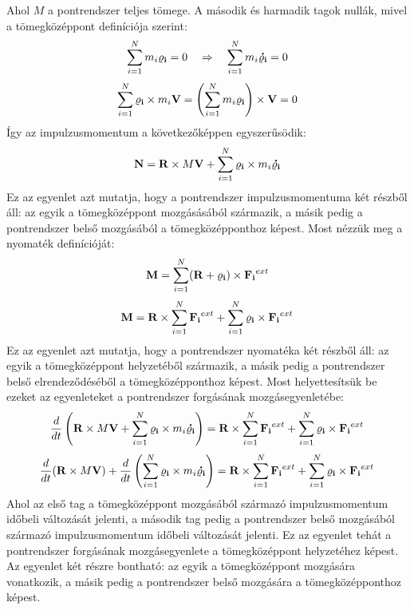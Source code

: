 \documentclass[a4paper,12pt]{article}
\begin{document}
Ahol $M$ a pontrendszer teljes tömege. A második és harmadik tagok nullák, mivel a tömegközéppont definíciója szerint:
\begin{equation}
    \sum_{i=1}^{N} m_i \bold{\varrho_i} = 0 \quad \Rightarrow \quad \sum_{i=1}^{N} m_i \bold{\dot{\varrho_i}} = 0
\end{equation}
\begin{equation}
    \sum_{i=1}^{N} \bold{\varrho_i} \times m_i \bold{V} = \left(\sum_{i=1}^{N} m_i \bold{\varrho_i}\right) \times \bold{V} = 0
\end{equation}
Így az impulzusmomentum a következőképpen egyszerűsödik:
\begin{equation}
    \bold{N} = \bold{R} \times M \bold{V} + \sum_{i=1}^{N} \bold{\varrho_i} \times m_i \bold{\dot{\varrho_i}}
\end{equation}
Ez az egyenlet azt mutatja, hogy a pontrendszer impulzusmomentuma két részből áll: az egyik a tömegközéppont mozgásásából származik, a másik pedig a pontrendszer belső mozgásából a tömegközépponthoz képest.
Most nézzük meg a nyomaték definícióját:
\begin{equation}
    \bold{M} = \sum_{i=1}^{N} (\bold{R} + \bold{\varrho_i}) \times \bold{F_i}^{ext}
\end{equation}
\begin{equation}
    \bold{M} = \bold{R} \times \sum_{i=1}^{N} \bold{F_i}^{ext} + \sum_{i=1}^{N} \bold{\varrho_i} \times \bold{F_i}^{ext}
\end{equation}
Ez az egyenlet azt mutatja, hogy a pontrendszer nyomatéka két részből áll: az egyik a tömegközéppont helyzetéből származik, a másik pedig a pontrendszer belső elrendeződéséből a tömegközépponthoz képest.
Most helyettesítsük be ezeket az egyenleteket a pontrendszer forgásának mozgásegyenletébe:
\begin{equation}
    \frac{d}{dt} \left(\bold{R} \times M \bold{V} + \sum_{i=1}^{N} \bold{\varrho_i} \times m_i \bold{\dot{\varrho_i}}\right) = \bold{R} \times \sum_{i=1}^{N} \bold{F_i}^{ext} + \sum_{i=1}^{N} \bold{\varrho_i} \times \bold{F_i}^{ext}
\end{equation}
\begin{equation}
    \frac{d}{dt} (\bold{R} \times M \bold{V}) + \frac{d}{dt} \left(\sum_{i=1}^{N} \bold{\varrho_i} \times m_i \bold{\dot{\varrho_i}}\right) = \bold{R} \times \sum_{i=1}^{N} \bold{F_i}^{ext} + \sum_{i=1}^{N} \bold{\varrho_i} \times \bold{F_i}^{ext}
\end{equation}
Ahol az első tag a tömegközéppont mozgásából származó impulzusmomentum időbeli változását jelenti, a második tag pedig a pontrendszer belső mozgásából származó impulzusmomentum időbeli változását jelenti.
Ez az egyenlet tehát a pontrendszer forgásának mozgásegyenlete a tömegközéppont helyzetéhez képest. Az egyenlet két részre bontható: az egyik a tömegközéppont mozgására vonatkozik, a másik pedig a pontrendszer belső mozgására a tömegközépponthoz képest.
\end{document}
